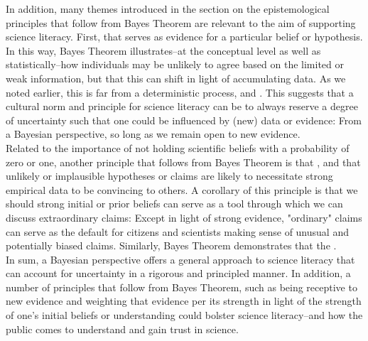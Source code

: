 In addition, many themes introduced in the section on the epistemological principles that follow from Bayes Theorem are relevant to the aim of supporting science literacy. First,  that serves as evidence for a particular belief or hypothesis. In this way, Bayes Theorem illustrates--at the conceptual level as well as statistically--how individuals may be unlikely to agree based on the limited or weak information, but that this can shift in light of accumulating data. As we noted earlier, this is far from a deterministic process, and . This suggests that a cultural norm and principle for science literacy can be to always reserve a degree of uncertainty such that one could be influenced by (new) data or evidence: From a Bayesian perspective,  so long as we remain open to new evidence. \\

Related to the importance of not holding scientific beliefs with a probability of zero or one, another principle that follows from Bayes Theorem is that , and that unlikely or implausible hypotheses or claims are likely to necessitate strong empirical data to be convincing to others. A corollary of this principle is that we should strong initial or prior beliefs can serve as a tool through which we can discuss extraordinary claims: Except in light of strong evidence, "ordinary" claims can serve as the default for citizens and scientists making sense of unusual and potentially biased claims. Similarly, Bayes Theorem demonstrates that the . \\ 

In sum, a Bayesian perspective offers a general approach to science literacy that can account for uncertainty in a rigorous and principled manner. In addition, a number of principles that follow from Bayes Theorem, such as being receptive to new evidence and weighting that evidence per its strength in light of the strength of one's initial beliefs or understanding could bolster science literacy--and how the public comes to understand and gain trust in science. \\